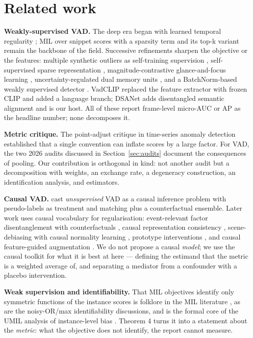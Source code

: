 \documentclass[number,preprint,12pt]{elsarticle}
\begin{document}
\section{Related work}\label{sec:related}

\textbf{Weakly-supervised VAD.} The deep era began with learned temporal regularity
\citep{hasan2016learning}; MIL over snippet scores with a sparsity term
\citep{sultani2018realworld} and its top-k variant \citep{tian2021rtfm}
remain the backbone of the field. Successive refinements sharpen the objective
or the features: multiple synthetic outliers as self-training supervision
\citep{li2022msl}, self-supervised sparse representation
\citep{wu2022s3r}, magnitude-contrastive glance-and-focus learning
\citep{chen2023mgfn}, uncertainty-regulated dual memory units
\citep{zhou2023urdmu}, and a BatchNorm-based weakly supervised
detector \citep{zhou2023bnwvad}. VadCLIP \citep{wu2024vadclip} replaced
the feature extractor with frozen CLIP and added a language branch; DSANet \citep{yin2026dsanet} adds
disentangled semantic alignment and is our host. All of these report
frame-level micro-AUC or AP as the headline number; none decomposes it.

\textbf{Metric critique.} The point-adjust critique in time-series anomaly detection
\citep{kim2022towards} established that a single convention can inflate scores
by a large factor. For VAD, the two 2026 audits discussed in Section~\ref{sec:audits} document the
consequences of pooling. Our contribution is orthogonal in kind: not another
audit but a decomposition with weights, an exchange rate, a degeneracy
construction, an identification analysis, and estimators.

\textbf{Causal VAD.} \citet{lin2022causal} cast \emph{unsupervised} VAD as a causal
inference problem with pseudo-labels as treatment and matching plus a
counterfactual ensemble. Later work uses causal vocabulary for regularisation:
event-relevant factor disentanglement with counterfactuals \citep{sun2023event}, causal
representation consistency \citep{cir2023causality}, scene-debiasing with causal normality
learning \citep{crcl2025causal}, prototype interventions \citep{ning2026civc}, and causal
feature-guided augmentation \citep{li2026causal}. We do not propose a causal \emph{model}; we
use the causal toolkit for what it is best at here --- defining the estimand that
the metric is a weighted average of, and separating a mediator from a confounder
with a placebo intervention.

\textbf{Weak supervision and identifiability.} That MIL objectives identify only
symmetric functions of the instance scores is folklore in the MIL literature
\citep{ilse2018attention}, as are the noisy-OR/max identifiability discussions, and is
the formal core of the UMIL analysis of instance-level bias \citep{umil2023unbiased}. Theorem 4 turns
it into a statement about the \emph{metric}: what the objective does not identify, the
report cannot measure.
\end{document}
